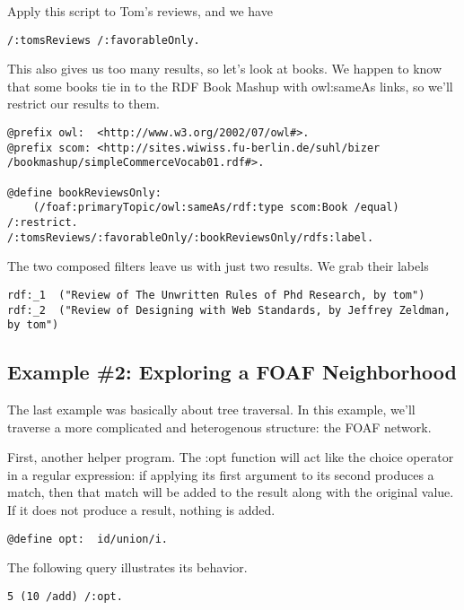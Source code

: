 \documentclass[runningheads]{llncs}
\begin{document}
Apply this script to Tom's reviews, and we have

\begin{verbatim}
/:tomsReviews /:favorableOnly.
\end{verbatim}

This also gives us too many results, so let's look at books.  We happen to know that some books tie in to the RDF Book Mashup with owl:sameAs links, so we'll restrict our results to them.

\begin{verbatim}
@prefix owl:  <http://www.w3.org/2002/07/owl#>.
@prefix scom: <http://sites.wiwiss.fu-berlin.de/suhl/bizer
/bookmashup/simpleCommerceVocab01.rdf#>.

@define bookReviewsOnly:
    (/foaf:primaryTopic/owl:sameAs/rdf:type scom:Book /equal) /:restrict.
/:tomsReviews/:favorableOnly/:bookReviewsOnly/rdfs:label.
\end{verbatim}

The two composed filters leave us with just two results.  We grab their labels

\begin{verbatim}
rdf:_1  ("Review of The Unwritten Rules of Phd Research, by tom")
rdf:_2  ("Review of Designing with Web Standards, by Jeffrey Zeldman, by tom")
\end{verbatim}


\subsection{Example \#2: Exploring a FOAF Neighborhood}

The last example was basically about tree traversal.  In this example, we'll traverse a more complicated and heterogenous structure: the FOAF network.

First, another helper program.  The :opt function will act like the choice operator in a regular expression: if applying its first argument to its second produces a match, then that match will be added to the result along with the original value.  If it does not produce a result, nothing is added.

\begin{verbatim}
@define opt:  id/union/i.
\end{verbatim}

The following query illustrates its behavior.

\begin{verbatim}
5 (10 /add) /:opt.
\end{verbatim}
\end{document}
